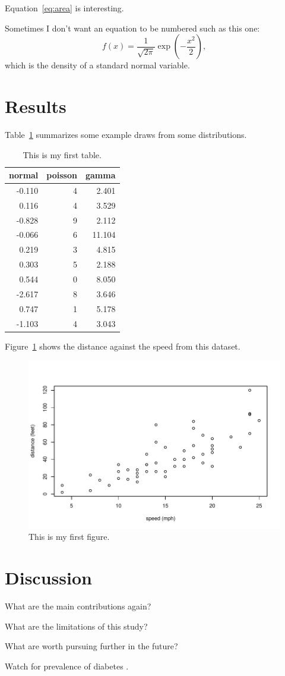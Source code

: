 \documentclass[12pt]{article}
\begin{document}
Equation~\eqref{eq:area} is interesting. \lipsum[1-4]

Sometimes I don't want an equation to be numbered such as this one:
\[
  f(x) = \frac{1}{\sqrt{2\pi}} \exp\left( - \frac{x^2}{2} \right),
\]
which is the density of a standard normal variable.



\section{Results}
\label{sec:resu}

Table~\ref{tab:rv} summarizes some example draws from some distributions.
\lipsum[1-4]

\begin{table}[tbp]
  \caption{This is my first table.}
  \label{tab:rv}
\centering
\begin{tabular}{rrr}
  \toprule
normal & poisson & gamma \\ 
  \midrule
-0.110 & 4 & 2.401 \\ 
  0.116 & 4 & 3.529 \\ 
  -0.828 & 9 & 2.112 \\ 
  -0.066 & 6 & 11.104 \\ 
  0.219 & 3 & 4.815 \\ 
  0.303 & 5 & 2.188 \\ 
  0.544 & 0 & 8.050 \\ 
  -2.617 & 8 & 3.646 \\ 
  0.747 & 1 & 5.178 \\ 
  -1.103 & 4 & 3.043 \\ 
   \bottomrule
\end{tabular}
\end{table}

Figure~\ref{fig:cars} shows the distance against the speed from this dataset.


\begin{figure}[tbp]
  \centering
  \includegraphics[width=\textwidth]{cars.pdf}
  \caption{This is my first figure.}
  \label{fig:cars}
\end{figure}

\section{Discussion}
\label{sec:disc}

What are the main contributions again?

What are the limitations of this study?

What are worth pursuing further in the future?

\lipsum[1-2]
Watch for prevalence of diabetes \citep{zhou2012loan}.



\end{document}
